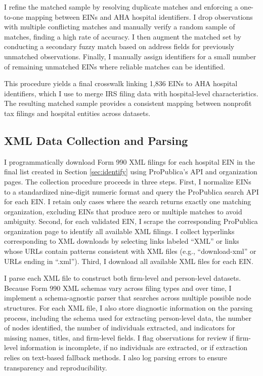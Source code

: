 \documentclass[12pt]{article}
\begin{document}
    I refine the matched sample by resolving duplicate matches and enforcing a one-to-one mapping between EINs and AHA hospital identifiers. I drop observations with multiple conflicting matches and manually verify a random sample of matches, finding a high rate of accuracy. I then augment the matched set by conducting a secondary fuzzy match based on address fields for previously unmatched observations. Finally, I manually assign identifiers for a small number of remaining unmatched EINs where reliable matches can be identified.

    This procedure yields a final crosswalk linking 1,836 EINs to AHA hospital identifiers, which I use to merge IRS filing data with hospital-level characteristics. The resulting matched sample provides a consistent mapping between nonprofit tax filings and hospital entities across datasets.


    \subsection{XML Data Collection and Parsing}

    I programmatically download Form 990 XML filings for each hospital EIN in the final list created in Section \ref{sec:identify} using ProPublica’s API and organization pages. The collection procedure proceeds in three steps. First, I normalize EINs to a standardized nine-digit numeric format and query the ProPublica search API for each EIN. I retain only cases where the search returns exactly one matching organization, excluding EINs that produce zero or multiple matches to avoid ambiguity. Second, for each validated EIN, I scrape the corresponding ProPublica organization page to identify all available XML filings. I collect hyperlinks corresponding to XML downloads by selecting links labeled ``XML'' or links whose URLs contain patterns consistent with XML files (e.g., ``download-xml'' or URLs ending in ``.xml''). Third, I download all available XML files for each EIN. 

    I parse each XML file to construct both firm-level and person-level datasets. Because Form 990 XML schemas vary across filing types and over time, I implement a schema-agnostic parser that searches across multiple possible node structures. For each XML file, I also store diagnostic information on the parsing process, including the schema used for extracting person-level data, the number of nodes identified, the number of individuals extracted, and indicators for missing names, titles, and firm-level fields. I flag observations for review if firm-level information is incomplete, if no individuals are extracted, or if extraction relies on text-based fallback methods. I also log parsing errors to ensure transparency and reproducibility.
\end{document}
